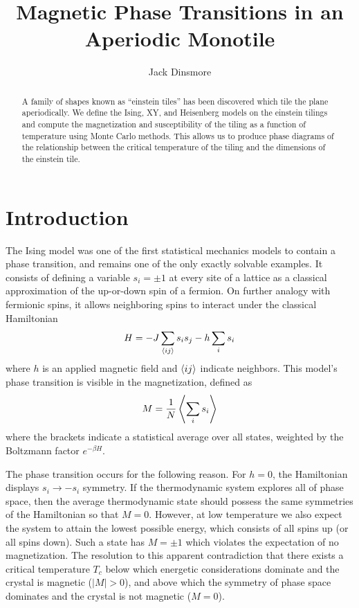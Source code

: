 \documentclass[
  amsmath,
  amssymb,
  aps,
  twocolumn,
  nofootinbib,
  nolongbibliography,
  floatfix,
]{revtex4-2}
\begin{document}
\title{Magnetic Phase Transitions in an Aperiodic Monotile}
\author{Jack Dinsmore}

\begin{abstract}
  A family of shapes known as ``einstein tiles'' has been discovered which tile the plane aperiodically. We define the Ising, XY, and Heisenberg models on the einstein tilings and compute the magnetization and susceptibility of the tiling as a function of temperature using Monte Carlo methods. This allows us to produce phase diagrams of the relationship between the critical temperature of the tiling and the dimensions of the einstein tile.
\end{abstract}

\maketitle

\section{Introduction}
The Ising model was one of the first statistical mechanics models to contain a phase transition, and remains one of the only exactly solvable examples. It consists of defining a variable $s_i = \pm 1$ at every site of a lattice as a classical approximation of the up-or-down spin of a fermion. On further analogy with fermionic spins, it allows neighboring spins to interact under the classical Hamiltonian
\begin{equation}
  H = -J \sum_{\braket{ij}} s_i s_j - h \sum_i s_i
  \label{eqn:ising}
\end{equation}
where $h$ is an applied magnetic field and $\braket{ij}$ indicate neighbors. This model's phase transition is visible in the magnetization, defined as
\begin{equation}
  M = \frac{1}{N}\Braket{\sum_{i} s_i}
  \label{eqn:magnetization}
\end{equation}
where the brackets indicate a statistical average over all states, weighted by the Boltzmann factor $e^{-\beta H}$.

The phase transition occurs for the following reason. For $h=0$, the Hamiltonian displays $s_i\rightarrow -s_i$ symmetry. If the thermodynamic system explores all of phase space, then the average thermodynamic state should possess the same symmetries of the Hamiltonian so that $M=0$. However, at low temperature we also expect the system to attain the lowest possible energy, which consists of all spins up (or all spins down). Such a state has $M =\pm 1$ which violates the expectation of no magnetization. The resolution to this apparent contradiction that there exists a critical temperature $T_c$ below which energetic considerations dominate and the crystal is magnetic ($|M|>0$), and above which the symmetry of phase space dominates and the crystal is not magnetic ($M = 0$).
\end{document}
